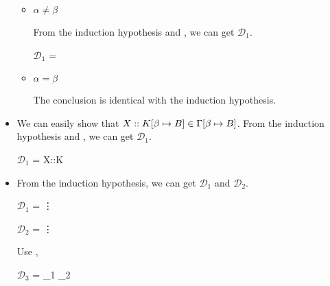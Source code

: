 \begin{itemize}
	      \begin{itemize}
	      		      		      		      	
	      	\item $\alpha \neq \beta$
	      	      	      	      	      	      	      	      
	      	      From the induction hypothesis and \WTW, we can get $\mathcal{D}_1$.
	      	      	      	      	      	      	      	      
	      	      $\mathcal{D}_1$ = 
	      	      {}
	      	      	      	      	      	      	      	      
	      	\item $\alpha = \beta$
	      	      	      	      	      	      	      	      
	      	      The conclusion is identical with the induction hypothesis.
	      	      	      	      	      	      	      	      
	      \end{itemize}
	      	      	      	      
	\item \KVar
	      	      	      	      
	      We can easily show that $X::K[\beta \mapsto B] \in \Gamma[\beta \mapsto B]$.
	      From the induction hypothesis and \KVar, we can get $\mathcal{D}_1$.
	      	      	      	      
	      $\mathcal{D}_1$ = 
	      {X::K\SB \in \GG \andalso {}}
	      	      	      	      
	\item \KAbs
	      	      	      	      
	      From the induction hypothesis, we can get $\mathcal{D}_1$ and $\mathcal{D}_2$.
	      	      	      	      
	      $\mathcal{D}_1$ = 
	      {\vdots}
	      	      	      	      
	      $\mathcal{D}_2$ = 
	      {\vdots}
	      	      	      	      
	      Use \KAbs,
	      	      	      	      
	      $\mathcal{D}_3$ = 
	      {_1 \andalso {}_2}
	      	      	      	      

\end{itemize}
